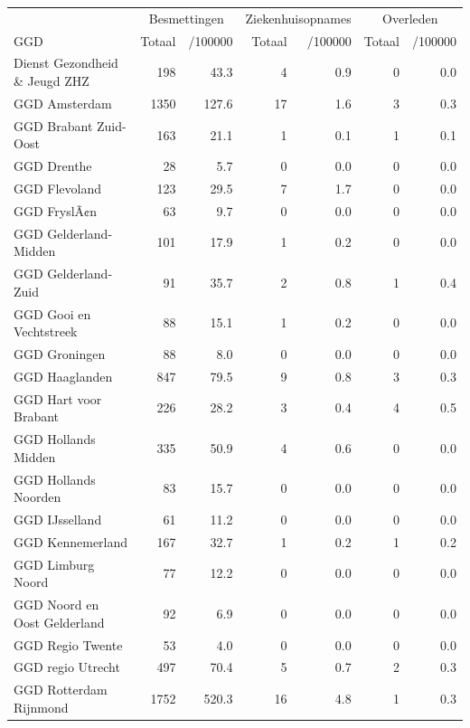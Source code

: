 \documentclass[
  english,
  man,floatsintext]{apa6}
\begin{document}
\begin{table}[H]
\centering\begingroup\fontsize{10}{12}\selectfont

\begin{threeparttable}
\begin{tabular}{lrrrrrr}
\toprule
\multicolumn{1}{c}{ } & \multicolumn{2}{c}{Besmettingen} & \multicolumn{2}{c}{Ziekenhuisopnames} & \multicolumn{2}{c}{Overleden} \\
\cmidrule(l{3pt}r{3pt}){2-3} \cmidrule(l{3pt}r{3pt}){4-5} \cmidrule(l{3pt}r{3pt}){6-7}
GGD & Totaal & /100000 & Totaal & /100000 & Totaal & /100000\\
\midrule
Dienst Gezondheid \& Jeugd ZHZ & 198 & 43.3 & 4 & 0.9 & 0 & 0.0\\
GGD Amsterdam & 1350 & 127.6 & 17 & 1.6 & 3 & 0.3\\
GGD Brabant Zuid-Oost & 163 & 21.1 & 1 & 0.1 & 1 & 0.1\\
GGD Drenthe & 28 & 5.7 & 0 & 0.0 & 0 & 0.0\\
GGD Flevoland & 123 & 29.5 & 7 & 1.7 & 0 & 0.0\\
GGD FryslÃ¢n & 63 & 9.7 & 0 & 0.0 & 0 & 0.0\\
GGD Gelderland-Midden & 101 & 17.9 & 1 & 0.2 & 0 & 0.0\\
GGD Gelderland-Zuid & 91 & 35.7 & 2 & 0.8 & 1 & 0.4\\
GGD Gooi en Vechtstreek & 88 & 15.1 & 1 & 0.2 & 0 & 0.0\\
GGD Groningen & 88 & 8.0 & 0 & 0.0 & 0 & 0.0\\
GGD Haaglanden & 847 & 79.5 & 9 & 0.8 & 3 & 0.3\\
GGD Hart voor Brabant & 226 & 28.2 & 3 & 0.4 & 4 & 0.5\\
GGD Hollands Midden & 335 & 50.9 & 4 & 0.6 & 0 & 0.0\\
GGD Hollands Noorden & 83 & 15.7 & 0 & 0.0 & 0 & 0.0\\
GGD IJsselland & 61 & 11.2 & 0 & 0.0 & 0 & 0.0\\
GGD Kennemerland & 167 & 32.7 & 1 & 0.2 & 1 & 0.2\\
GGD Limburg Noord & 77 & 12.2 & 0 & 0.0 & 0 & 0.0\\
GGD Noord en Oost Gelderland & 92 & 6.9 & 0 & 0.0 & 0 & 0.0\\
GGD Regio Twente & 53 & 4.0 & 0 & 0.0 & 0 & 0.0\\
GGD regio Utrecht & 497 & 70.4 & 5 & 0.7 & 2 & 0.3\\
GGD Rotterdam Rijnmond & 1752 & 520.3 & 16 & 4.8 & 1 & 0.3\\

\end{tabular}
\end{threeparttable}
\end{table}
\end{document}
